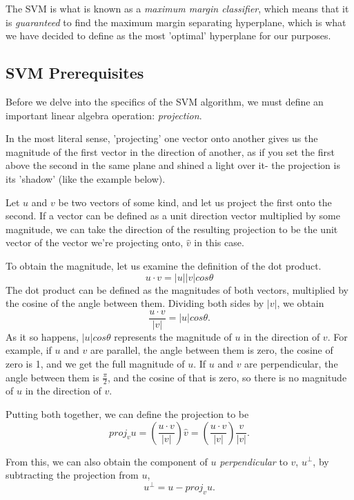 The SVM is what is known as a \textit{maximum margin classifier}, which means that it is \textit{guaranteed} to find the maximum margin separating hyperplane, which is what we have decided to define as the most 'optimal' hyperplane for our purposes.

\subsection{SVM Prerequisites}
Before we delve into the specifics of the SVM algorithm, we must define an important linear algebra operation: \textit{projection}.

In the most literal sense, 'projecting' one vector onto another gives us the magnitude of the first vector in the direction of another, as if you set the first above the second in the same plane and shined a light over it- the projection is its 'shadow' (like the example below).


Let $u$ and $v$ be two vectors of some kind, and let us project the first onto the second. If a vector can be defined as a unit direction vector multiplied by some magnitude, we can take the direction of the resulting projection to be the unit vector of the vector we're projecting onto, $\hat{v}$ in this case.

To obtain the magnitude, let us examine the definition of the dot product.
\[
    u \cdot v = |u||v|cos\theta
\]
The dot product can be defined as the magnitudes of both vectors, multiplied by the cosine of the angle between them. Dividing both sides by $|v|$, we obtain
\[
    \frac{u \cdot v}{|v|} = |u|cos\theta.
\]
As it so happens, $|u|cos\theta$ represents the magnitude of $u$ in the direction of $v$. For example, if $u$ and $v$ are parallel, the angle between them is zero, the cosine of zero is 1, and we get the full magnitude of $u$. If $u$ and $v$ are perpendicular, the angle between them is $\frac{\pi}{2}$, and the cosine of that is zero, so there is no magnitude of $u$ in the direction of $v$.

Putting both together, we can define the projection to be
\[
    proj_vu = (\frac{u \cdot v}{|v|})\hat{v} = (\frac{u \cdot v}{|v|})\frac{v}{|v|}.
\]

From this, we can also obtain the component of $u$ \textit{perpendicular} to $v$, $u^\perp$, by subtracting the projection from $u$,
\[
    u^\perp = u - proj_vu.
\]

